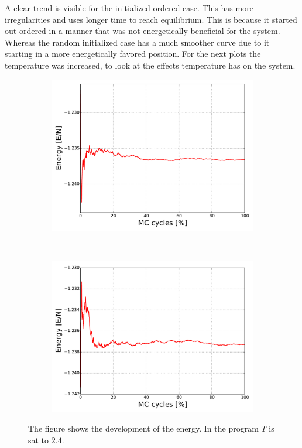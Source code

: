 A clear trend is visible for the initialized ordered case. This has more irregularities and uses longer time to reach equilibrium. This is because it started out ordered in a manner that was not energetically beneficial for the system. Whereas the random initialized case has a much smoother curve due to it starting in a more energetically favored position. For the next plots the temperature was increased, to look at the effects temperature has on the system.




\begin{figure}[H]
    \centering
    \begin{subfigure}{0.5\textwidth}
        \centering
        \includegraphics[width=\linewidth]{result/bilder/20x20/E-N20-T24}
        \caption{}
    \end{subfigure}%
    ~ 
    \begin{subfigure}{0.5\textwidth}
        \centering
        \includegraphics[width=\linewidth]{result/bilder/20x20/E-N20-T24-RNG}
        \caption{}
    \end{subfigure}
    \caption{The figure shows the development of the energy. In the program $T$ is sat to $2.4$.}
    \label{fig:}
\end{figure}

